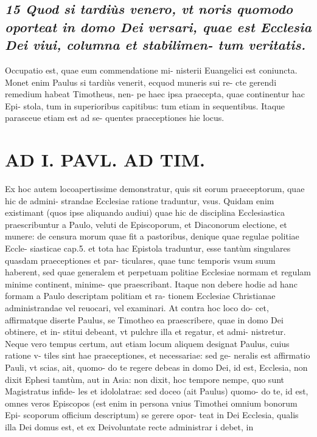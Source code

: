 \documentclass{article}
\begin{document}
\begin{pages}
\subsection*{\textit{15 Quod si tardiùs venero, vt noris quomodo oporteat in domo Dei versari, quae est Ecclesia Dei viui, columna et stabilimen- tum veritatis. }}\pstart Occupatio est, quae eum commendatione mi- nisterii Euangelici est coniuncta. Monet enim Paulus si tardiùs venerit, ecquod muneris sui re- cte gerendi remedium habeat Timotheus, nen- pe haec ipsa praecepta, quae continentur hac Epi- stola, tum in superioribus capitibus: tum etiam in sequentibus. Itaque parasceue etiam est ad se- quentes praeceptiones hie locus.  \pend
\section*{AD I. PAVL. AD TIM. }
\marginpar{[ p.168 ]}\pstart Ex hoc autem locoapertissime demonstratur, quis sit eorum praeceptorum, quae hic de admini- strandae Ecclesiae ratione traduntur, vsus. Quidam enim existimant (quos ipse aliquando audiui) quae hic de disciplina Ecclesiastica praescribuntur a Paulo, veluti de Episcoporum, et Diaconorum electione, et munere: de censura morum quae fit a pastoribus, denique quae regulae politiae Eccle- siasticae cap.5. et tota hac Epistola traduntur, esse tantùm singulares quasdam praeceptiones et par- ticulares, quae tunc temporis vsum suum haberent, sed quae generalem et perpetuam politiae Ecclesiae normam et regulam minime continent, minime- que praescribant. Itaque non debere hodie ad hanc formam a Paulo descriptam politiam et ra- tionem Ecclesiae Christianae administrandae vel reuocari, vel examinari. At contra hoc loco do- cet, affirmatque diserte Paulus, se Timotheo ea praescribere, quae in domo Dei obtinere, et in- stitui debeant, vt pulchre illa et regatur, et admi- nistretur. Neque vero tempus certum, aut etiam locum aliquem designat Paulus, cuius ratione v- tiles sint hae praeceptiones, et necessariae: sed ge- neralis est affirmatio Pauli, vt scias, ait, quomo- do te regere debeas in domo Dei, id est, Ecclesia, non dixit Ephesi tamtùm, aut in Asia: non dixit, hoc tempore nempe, quo sunt Magistratus infide- les et idololatrae: sed doceo (ait Paulus) quomo- do te, id est, omnes veros Episcopos (est enim in persona vnius Timothei omnium bonorum Epi- scoporum officium descriptum) se gerere opor- teat in Dei Ecclesia, qualis illa Dei domus est, et ex Deivoluntate recte administrar i debet, in  \pend

\end{pages}
\end{document}
